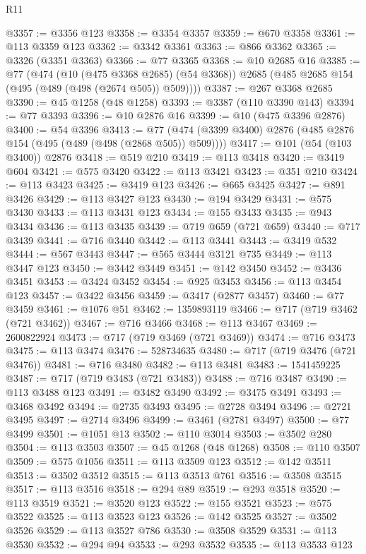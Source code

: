 \begin{lexlean}{R11}
\begin{coremodule}
{{{{{{{{{{{{{{{{{{{{{{{{{{{{{{{{{{{{{{{{{{{{{{{{{{{{{{{{{{{{{{{{{{{{{{{{{{{{{{{{{{{{{{{{{{{{{{{{{{{{{{{{{{@3357 := @3356 @123
@3358 := @3354 @3357
@3359 := @670 @3358
@3361 := @113 @3359 @123
@3362 := @3342 @3361
@3363 := @866 @3362
@3365 := @3326 (@3351 @3363)
@3366 := @77 @3365
@3368 := @10 @2685 @16
@3385 := @77
    (@474
      (@10 (@475 @3368 @2685) (@54 @3368))
      @2685
      (@485 @2685 @154 (@495 (@489 (@498 (@2674 @505)) @509))))
@3387 := @267 @3368 @2685
@3390 := @45 @1258 (@48 @1258)
@3393 := @3387 (@110 @3390 @143)
@3394 := @77 @3393
@3396 := @10 @2876 @16
@3399 := @10 (@475 @3396 @2876)
@3400 := @54 @3396
@3413 := @77 (@474 (@3399 @3400) @2876 (@485 @2876 @154 (@495 (@489 (@498 (@2868 @505)) @509))))
@3417 := @101 (@54 (@103 @3400)) @2876
@3418 := @519 @210
@3419 := @113 @3418
@3420 := @3419 @604
@3421 := @575 @3420
@3422 := @113 @3421
@3423 := @351 @210
@3424 := @113 @3423
@3425 := @3419 @123
@3426 := @665 @3425
@3427 := @891 @3426
@3429 := @113 @3427 @123
@3430 := @194 @3429
@3431 := @575 @3430
@3433 := @113 @3431 @123
@3434 := @155 @3433
@3435 := @943 @3434
@3436 := @113 @3435
@3439 := @719 @659 (@721 @659)
@3440 := @717 @3439
@3441 := @716 @3440
@3442 := @113 @3441
@3443 := @3419 @532
@3444 := @567 @3443
@3447 := @565 @3444 @3121 @735
@3449 := @113 @3447 @123
@3450 := @3442 @3449
@3451 := @142 @3450
@3452 := @3436 @3451
@3453 := @3424 @3452
@3454 := @925 @3453
@3456 := @113 @3454 @123
@3457 := @3422 @3456
@3459 := @3417 (@2877 @3457)
@3460 := @77 @3459
@3461 := @1076 @51
@3462 := 1359893119
@3466 := @717 (@719 @3462 (@721 @3462))
@3467 := @716 @3466
@3468 := @113 @3467
@3469 := 2600822924
@3473 := @717 (@719 @3469 (@721 @3469))
@3474 := @716 @3473
@3475 := @113 @3474
@3476 := 528734635
@3480 := @717 (@719 @3476 (@721 @3476))
@3481 := @716 @3480
@3482 := @113 @3481
@3483 := 1541459225
@3487 := @717 (@719 @3483 (@721 @3483))
@3488 := @716 @3487
@3490 := @113 @3488 @123
@3491 := @3482 @3490
@3492 := @3475 @3491
@3493 := @3468 @3492
@3494 := @2735 @3493
@3495 := @2728 @3494
@3496 := @2721 @3495
@3497 := @2714 @3496
@3499 := @3461 (@2781 @3497)
@3500 := @77 @3499
@3501 := @1051 @13
@3502 := @110 @3014
@3503 := @3502 @280
@3504 := @113 @3503
@3507 := @45 @1268 (@48 @1268)
@3508 := @110 @3507
@3509 := @575 @1056
@3511 := @113 @3509 @123
@3512 := @142 @3511
@3513 := @3502 @3512
@3515 := @113 @3513 @761
@3516 := @3508 @3515
@3517 := @113 @3516
@3518 := @294 @89
@3519 := @293 @3518
@3520 := @113 @3519
@3521 := @3520 @123
@3522 := @155 @3521
@3523 := @575 @3522
@3525 := @113 @3523 @123
@3526 := @142 @3525
@3527 := @3502 @3526
@3529 := @113 @3527 @786
@3530 := @3508 @3529
@3531 := @113 @3530
@3532 := @294 @94
@3533 := @293 @3532
@3535 := @113 @3533 @123
}}}}}}}}}}}}}}}}}}}}}}}}}}}}}}}}}}}}}}}}}}}}}}}}}}}}}}}}}}}}}}}}}}}}}}}}}}}}}}}}}}}}}}}}}}}}}}}}}}}}}}}}}}
\end{coremodule}
\end{lexlean}
